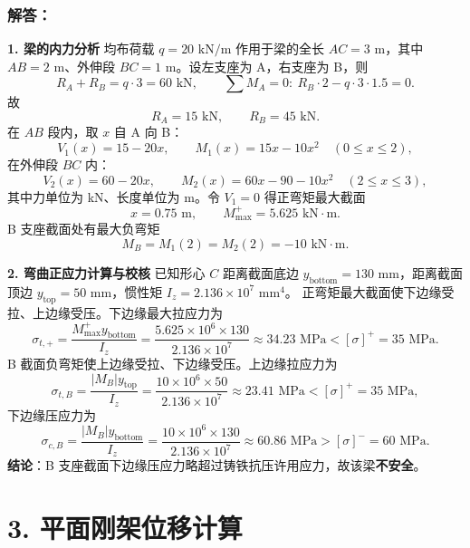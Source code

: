 \documentclass[11pt,a4paper]{ctexrep}
\begin{document}
{\begin{center}
\end{center}

\subsubsection*{解答：}

\textbf{1. 梁的内力分析}
均布荷载 $q=20\text{ kN/m}$ 作用于梁的全长 $AC=3\text{ m}$，其中 $AB=2\text{ m}$、外伸段 $BC=1\text{ m}$。设左支座为 A，右支座为 B，则
\[
R_A+R_B=q\cdot 3=60\text{ kN},\qquad
\sum M_A=0:\ R_B\cdot2-q\cdot3\cdot1.5=0.
\]
故
\[
R_A=15\text{ kN},\qquad R_B=45\text{ kN}.
\]
在 $AB$ 段内，取 $x$ 自 A 向 B：
\[
V_1(x)=15-20x,\qquad
M_1(x)=15x-10x^2\quad(0\le x\le2),
\]
在外伸段 $BC$ 内：
\[
V_2(x)=60-20x,\qquad
M_2(x)=60x-90-10x^2\quad(2\le x\le3),
\]
其中力单位为 kN、长度单位为 m。令 $V_1=0$ 得正弯矩最大截面
\[
x=0.75\text{ m},\qquad M_{\max}^{+}=5.625\text{ kN}\cdot\text{m}.
\]
B 支座截面处有最大负弯矩
\[
M_B=M_1(2)=M_2(2)=-10\text{ kN}\cdot\text{m}.
\]

\textbf{2. 弯曲正应力计算与校核}
已知形心 $C$ 距离截面底边 $y_{\text{bottom}}=130\text{ mm}$，距离截面顶边 $y_{\text{top}}=50\text{ mm}$，惯性矩 $I_z=2.136\times10^7\text{ mm}^4$。
正弯矩最大截面使下边缘受拉、上边缘受压。下边缘最大拉应力为
\[
\sigma_{t,+}=\frac{M_{\max}^{+}y_{\text{bottom}}}{I_z}
=\frac{5.625\times10^6\times130}{2.136\times10^7}
\approx34.23\text{ MPa}<[\sigma]^+=35\text{ MPa}.
\]
B 截面负弯矩使上边缘受拉、下边缘受压。上边缘拉应力为
\[
\sigma_{t,B}=\frac{|M_B|y_{\text{top}}}{I_z}
=\frac{10\times10^6\times50}{2.136\times10^7}
\approx23.41\text{ MPa}<[\sigma]^+=35\text{ MPa},
\]
下边缘压应力为
\[
\sigma_{c,B}=\frac{|M_B|y_{\text{bottom}}}{I_z}
=\frac{10\times10^6\times130}{2.136\times10^7}
\approx60.86\text{ MPa}>[\sigma]^-=60\text{ MPa}.
\]
\textbf{结论}：B 支座截面下边缘压应力略超过铸铁抗压许用应力，故该梁\textbf{不安全}。




\section*{3. 平面刚架位移计算}

}
\end{document}
